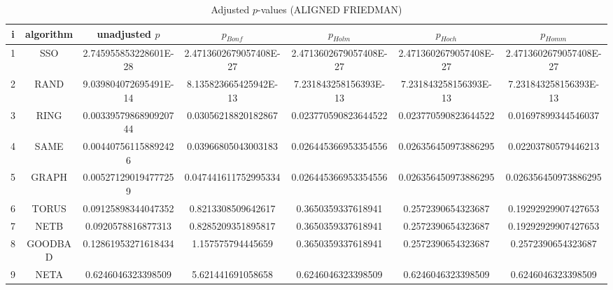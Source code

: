 \documentclass[a4paper,10pt]{article}
\begin{document}
\begin{landscape}
\begin{table}[!htp]
\centering\scriptsize
\caption{Adjusted $p$-values (ALIGNED FRIEDMAN)}
\begin{tabular}{ccccccc}
i&algorithm&unadjusted $p$&$p_{Bonf}$&$p_{Holm}$&$p_{Hoch}$&$p_{Homm}$\\
\hline
1& SSO&2.745955853228601E-28&2.4713602679057408E-27&2.4713602679057408E-27&2.4713602679057408E-27&2.4713602679057408E-27\\
2& RAND&9.039804072695491E-14&8.135823665425942E-13&7.231843258156393E-13&7.231843258156393E-13&7.231843258156393E-13\\
3& RING&0.0033957986890920744&0.03056218820182867&0.023770590823644522&0.023770590823644522&0.01697899344546037\\
4& SAME&0.004407561158892426&0.03966805043003183&0.026445366953354556&0.026356450973886295&0.02203780579446213\\
5& GRAPH&0.005271290194777259&0.047441611752995334&0.026445366953354556&0.026356450973886295&0.026356450973886295\\
6& TORUS&0.09125898344047352&0.8213308509642617&0.3650359337618941&0.2572390654323687&0.19292929907427653\\
7& NETB&0.0920578816877313&0.8285209351895817&0.3650359337618941&0.2572390654323687&0.19292929907427653\\
8& GOODBAD&0.12861953271618434&1.157575794445659&0.3650359337618941&0.2572390654323687&0.2572390654323687\\
9& NETA&0.6246046323398509&5.621441691058658&0.6246046323398509&0.6246046323398509&0.6246046323398509\\
\hline
\end{tabular}
\end{table}


\end{landscape}
\end{document}
